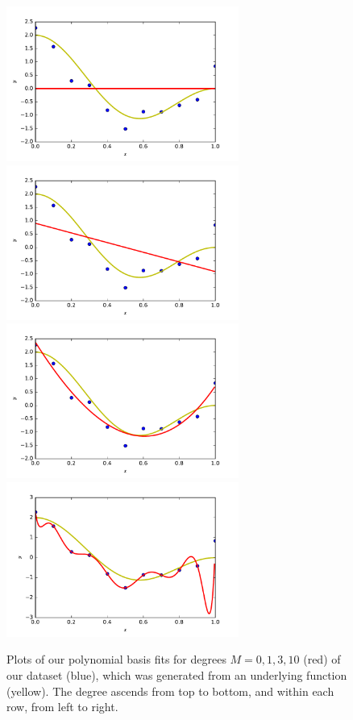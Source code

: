 \documentclass{article}
\begin{document}
\begin{figure} %
   \centering
   \includegraphics[width=3in]{img/2-1_degree0.pdf}  %
   \includegraphics[width=3in]{img/2-1_degree1.pdf}  %
   \includegraphics[width=3in]{img/2-1_degree3.pdf}  %
   \includegraphics[width=3in]{img/2-1_degree10.pdf}  %
   \caption{Plots of our polynomial basis fits for degrees $M=0,1,3,10$ (red) of our dataset (blue), which was generated from an underlying function (yellow).
   The degree ascends from top to bottom, and within each row, from left to right.}
   \label{fig:2.1-polybasis}
\end{figure}
\end{document}
